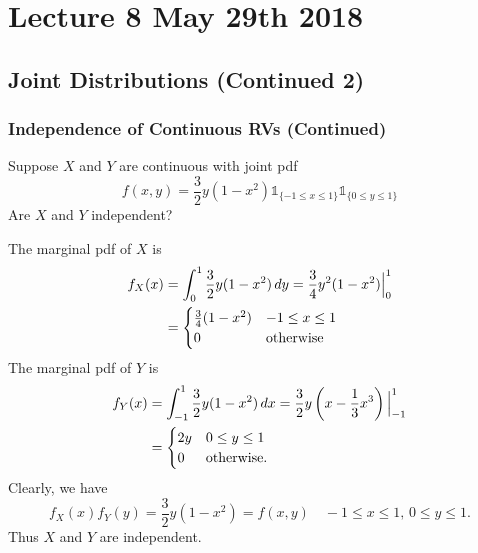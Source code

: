 \documentclass[notoc,notitlepage]{tufte-book}
\begin{document}



\chapter{Lecture 8 May 29th 2018}%
\label{chp:lecture_8_may_29th_2018}

\section{Joint Distributions (Continued 2)}%
\label{sec:joint_distributions_continued_2}

\subsection{Independence of Continuous RVs (Continued)}%
\label{sub:independence_of_continuous_rvs_continued}

\begin{eg}
  Suppose $X$ and $Y$ are continuous with joint pdf
  \begin{equation*}
    f(x, y) = \frac{3}{2} y (1 - x^2) \mathbb{1}_{\{-1 \leq x \leq 1 \}} \mathbb{1}_{\{0 \leq y \leq 1 \}}
  \end{equation*}
  Are $X$ and $Y$ independent?

  \begin{solution}
    The marginal pdf of $X$ is
    \begin{align*}
      f_X(x) &= \int_{0}^{1} \frac{3}{2}y (1 - x^2) \mathop{}\!d{y} = \frac{3}{4}y^2 (1 - x^2) \Big|_{0}^{1} \\
        &= \begin{cases}
          \frac{3}{4} ( 1 - x^2 ) & -1 \leq x \leq 1 \\
          0 & \text{otherwise}
        \end{cases}
    \end{align*}
    The marginal pdf of $Y$ is
    \begin{align*}
      f_Y(x) &= \int_{-1}^{1} \frac{3}{2} y (1 - x^2) \mathop{}\!d{x} = \frac{3}{2} y \left(x - \frac{1}{3}x^3 \right) \Big|_{-1}^{1} \\
      &= \begin{cases}
        2y & 0 \leq y \leq 1 \\
        0 & \text{otherwise.}
      \end{cases}
    \end{align*}
    Clearly, we have 
    \begin{equation*}
      f_X(x) f_Y(y) = \frac{3}{2} y (1 - x^2) = f(x, y) \quad -1 \leq x \leq 1, \, 0 \leq y \leq 1.
    \end{equation*}
    Thus $X$ and $Y$ are independent.
  \end{solution}
\end{eg}
\end{document}
